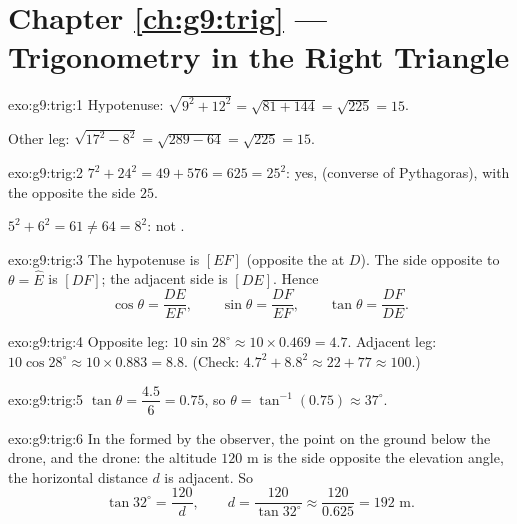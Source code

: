 \section*{Chapter \ref{ch:g9:trig} --- Trigonometry in the Right Triangle}

\begin{solution}{exo:g9:trig:1}
Hypotenuse: $\sqrt{9^2 + 12^2} = \sqrt{81 + 144} = \sqrt{225} = 15$.

Other leg: $\sqrt{17^2 - 8^2} = \sqrt{289 - 64} = \sqrt{225} = 15$.
\end{solution}

\begin{solution}{exo:g9:trig:2}
$7^2 + 24^2 = 49 + 576 = 625 = 25^2$: yes,  (converse of
Pythagoras), with the  opposite the side $25$.

$5^2 + 6^2 = 61 \neq 64 = 8^2$: not .
\end{solution}

\begin{solution}{exo:g9:trig:3}
The hypotenuse is $[EF]$ (opposite the  at $D$). The side
opposite to $\theta = \widehat E$ is $[DF]$; the adjacent side is
$[DE]$. Hence
\[
\cos\theta = \frac{DE}{EF}, \qquad
\sin\theta = \frac{DF}{EF}, \qquad
\tan\theta = \frac{DF}{DE}.
\]
\end{solution}

\begin{solution}{exo:g9:trig:4}
Opposite leg: $10 \sin 28^\circ \approx 10 \times 0.469 = 4.7$.
Adjacent leg: $10 \cos 28^\circ \approx 10 \times 0.883 = 8.8$.
(Check: $4.7^2 + 8.8^2 \approx 22 + 77 \approx 100$.)
\end{solution}

\begin{solution}{exo:g9:trig:5}
$\tan\theta = \dfrac{4.5}{6} = 0.75$, so
$\theta = \tan^{-1}(0.75) \approx 37^\circ$.
\end{solution}

\begin{solution}{exo:g9:trig:6}
In the  formed by the observer, the point on the ground
below the drone, and the drone: the altitude $120$ m is the side
opposite the elevation angle, the horizontal distance $d$ is adjacent.
So
\[
\tan 32^\circ = \frac{120}{d},
\qquad
d = \frac{120}{\tan 32^\circ} \approx \frac{120}{0.625} = 192 \text{ m}.
\]
\end{solution}


